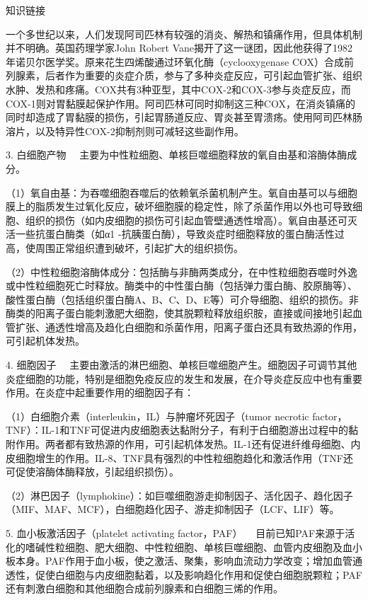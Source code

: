 {知识链接}

一个多世纪以来，人们发现阿司匹林有较强的消炎、解热和镇痛作用，但具体机制并不明确。英国药理学家John
Robert
Vane揭开了这一谜团，因此他获得了1982年诺贝尔医学奖。原来花生四烯酸通过环氧化酶（cyclooxygenase
COX）合成前列腺素，后者作为重要的炎症介质，参与了多种炎症反应，可引起血管扩张、组织水肿、发热和疼痛。COX共有3种亚型，其中COX-2和COX-3参与炎症反应，而COX-1则对胃黏膜起保护作用。阿司匹林可同时抑制这三种COX，在消炎镇痛的同时却造成了胃黏膜的损伤，引起胃肠道反应、胃炎甚至胃溃疡。使用阿司匹林肠溶片，以及特异性COX-2抑制剂则可减轻这些副作用。

{3. 白细胞产物}
　主要为中性粒细胞、单核巨噬细胞释放的氧自由基和溶酶体酶成分。

（1）氧自由基：为吞噬细胞吞噬后的依赖氧杀菌机制产生。氧自由基可以与细胞膜上的脂质发生过氧化反应，破坏细胞膜的稳定性，除了杀菌作用以外也可导致细胞、组织的损伤（如内皮细胞的损伤可引起血管壁通透性增高）。氧自由基还可灭活一些抗蛋白酶类（如α{1}
-抗胰蛋白酶），导致炎症时细胞释放的蛋白酶活性过高，使周围正常组织遭到破坏，引起扩大的组织损伤。

（2）中性粒细胞溶酶体成分：包括酶与非酶两类成分，在中性粒细胞吞噬时外逸或中性粒细胞死亡时释放。酶类中的中性蛋白酶（包括弹力蛋白酶、胶原酶等）、酸性蛋白酶（包括组织蛋白酶A、B、C、D、E等）可介导细胞、组织的损伤。非酶类的阳离子蛋白能刺激肥大细胞，使其脱颗粒释放组织胺，直接或间接地引起血管扩张、通透性增高及趋化白细胞和杀菌作用，阳离子蛋白还具有致热源的作用，可引起机体发热。

{4. 细胞因子}
　主要由激活的淋巴细胞、单核巨噬细胞产生。细胞因子可调节其他炎症细胞的功能，特别是细胞免疫反应的发生和发展，在介导炎症反应中也有重要作用。在炎症中起重要作用的细胞因子有：

（1）白细胞介素（interleukin，IL）与肿瘤坏死因子（tumor necrotic
factor，TNF）：IL-1和TNF可促进内皮细胞表达黏附分子，有利于白细胞游出过程中的黏附作用。两者都有致热源的作用，可引起机体发热。IL-1还有促进纤维母细胞、内皮细胞增生的作用。IL-8、TNF具有强烈的中性粒细胞趋化和激活作用（TNF还可促使溶酶体酶释放，引起组织损伤）。

（2）淋巴因子（lymphokine）：如巨噬细胞游走抑制因子、活化因子、趋化因子（MIF、MAF、MCF），白细胞趋化因子、游走抑制因子（LCF、LIF）等。

{5. 血小板激活因子（platelet activating factor，PAF）}
　目前已知PAF来源于活化的嗜碱性粒细胞、肥大细胞、中性粒细胞、单核巨噬细胞、血管内皮细胞及血小板本身。PAF作用于血小板，使之激活、聚集，影响血流动力学改变；增加血管通透性，促使白细胞与内皮细胞黏着，以及影响趋化作用和促使白细胞脱颗粒；PAF还有刺激白细胞和其他细胞合成前列腺素和白细胞三烯的作用。

